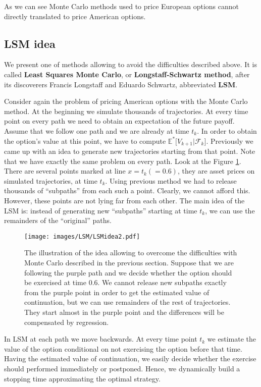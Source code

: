 \documentclass[a4paper,11pt, twoside]{book}
\theoremstyle{definition}
\theoremstyle{remark}
\def\Em{{\mathbb{E}^*}}
\begin{document}
As we can see Monte Carlo methods used to price European options cannot directly translated to price American options.
\newpage
\subsection{LSM idea}
\label{subsec:LSMidea}

We present one of methods allowing to avoid the difficulties described above. It is called \textbf{Least Squares Monte Carlo}, or \textbf{Longstaff-Schwartz method}, after its discoverers Francis Longstaff and Eduardo Schwartz, abbreviated \textbf{LSM}.

Consider again the problem of pricing American options with the Monte Carlo method. At the beginning we simulate thousands of trajectories. At every time point on every path we need to obtain an expectation of the future payoff. Assume that we follow one path and we are already at time $t_k$. In order to obtain the option's value at this point, we have to compute $\Em\bigl[ V_{k+1} | \mathcal{F}_{k} \bigr]$. Previously we came up with an idea to generate new trajectories starting from that point.
Note that we have exactly the same problem on every path. Look at the Figure \ref{fig:LSMidea}. There are several points marked at line $x = t_k (= 0.6)$, they are asset prices on simulated trajectories, at time $t_k$. Using previous method we had to release thousands of ``subpaths'' from each such a point. Clearly, we cannot afford this. However, these points are not lying far from each other. The main idea of the LSM is: instead of generating new ``subpaths'' starting at time $t_k$, we can use the remainders of the ``original'' paths.
\begin{figure}
\centering
 \texttt{[image: images/LSM/LSMidea2.pdf]}
\caption{The illustration of the idea allowing to overcome the difficulties with Monte Carlo described in the previous section. Suppose that we are following the purple path and we decide whether the option should be exercised at time $0.6$. We cannot release new subpaths exactly from the purple point in order to get the estimated value of continuation, but we can use remainders of the rest of trajectories. They start almost in the purple point and the differences will be compensated by regression.}
\label{fig:LSMidea}
\end{figure}

In LSM at each path we move backwards. At every time point $t_k$ we estimate the value of the option conditional on not exercising the option before that time. Having the estimated value of continuation, we easily decide whether the exercise should performed immediately or postponed. Hence, we dynamically build a stopping time approximating the optimal strategy.
\end{document}
